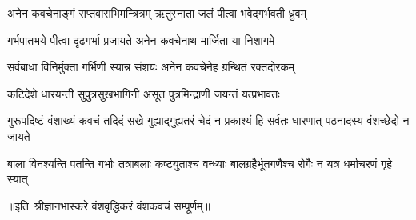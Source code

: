 \twolineshloka
{अनेन कवचेनाङ्गं सप्तवाराभिमन्त्रित्रम्}
{ऋतुस्नाता जलं पीत्वा भवेद्गर्भवती ध्रुवम्}%

\twolineshloka
{गर्भपातभये पीत्वा दृढगर्भा प्रजायते}
{अनेन कवचेनाथ मार्जिता या निशागमे}%

\twolineshloka
{सर्वबाधा विनिर्मुक्ता गर्भिणी स्यान्न संशयः}
{अनेन कवचेनेह ग्रन्थितं रक्तदोरकम्}%

\twolineshloka
{कटिदेशे धारयन्ती सुपुत्रसुखभागिनी}
{असूत पुत्रमिन्द्राणी जयन्तं यत्प्रभावतः}%

\threelineshloka
{गुरूपदिष्टं वंशाख्यं कवचं तदिदं सखे}
{गुह्याद्गुह्यतरं चेदं न प्रकाश्यं हि सर्वतः}
{धारणात् पठनादस्य वंशच्छेदो न जायते}%

\fourlineindentedshloka
{बाला विनश्यन्ति पतन्ति गर्भाः}
{तत्राबलाः कष्टयुताश्च वन्ध्याः}
{बालग्रहैर्भूतगणैश्च रोगैः}
{न यत्र धर्माचरणं गृहे स्यात्}

{॥इति~श्रीज्ञानभास्करे वंशवृद्धिकरं वंशकवचं सम्पूर्णम्॥}
